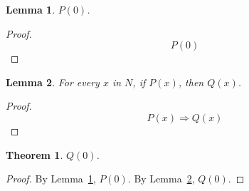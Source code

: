 \documentclass{article}
\newtheorem{lemma}{Lemma}
\newtheorem{theorem}{Theorem}
\begin{document}
\begin{lemma}\label{lem:available}
$P(0)$.
\end{lemma}
\begin{proof}
\[
P(0)
\]
\end{proof}

\begin{lemma}\label{lem:transfer}
For every $x$ in $N$, if $P(x)$, then $Q(x)$.
\end{lemma}
\begin{proof}
\[
P(x) \Rightarrow Q(x)
\]
\end{proof}

\begin{theorem}\label{thm:main}
$Q(0)$.
\end{theorem}
\begin{proof}
By Lemma~\ref{lem:available}, $P(0)$.
By Lemma~\ref{lem:transfer}, $Q(0)$.
\end{proof}
\end{document}

